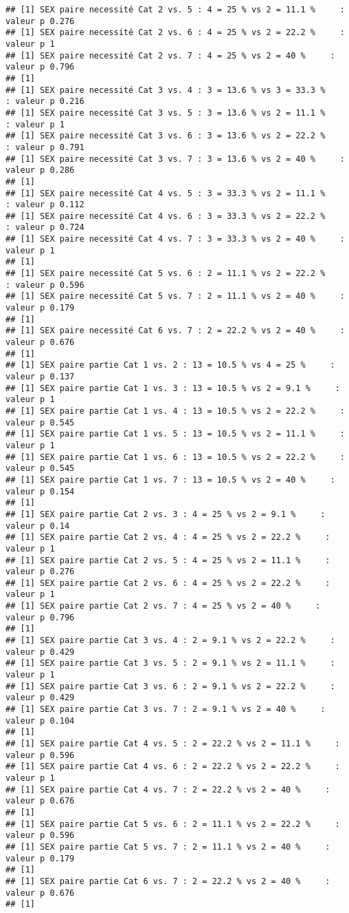 \documentclass[
]{article}
\begin{document}
\begin{verbatim}
## [1] SEX paire necessité Cat 2 vs. 5 : 4 = 25 % vs 2 = 11.1 %     : valeur p 0.276
## [1] SEX paire necessité Cat 2 vs. 6 : 4 = 25 % vs 2 = 22.2 %     : valeur p 1
## [1] SEX paire necessité Cat 2 vs. 7 : 4 = 25 % vs 2 = 40 %     : valeur p 0.796
## [1] 
## [1] SEX paire necessité Cat 3 vs. 4 : 3 = 13.6 % vs 3 = 33.3 %     : valeur p 0.216
## [1] SEX paire necessité Cat 3 vs. 5 : 3 = 13.6 % vs 2 = 11.1 %     : valeur p 1
## [1] SEX paire necessité Cat 3 vs. 6 : 3 = 13.6 % vs 2 = 22.2 %     : valeur p 0.791
## [1] SEX paire necessité Cat 3 vs. 7 : 3 = 13.6 % vs 2 = 40 %     : valeur p 0.286
## [1] 
## [1] SEX paire necessité Cat 4 vs. 5 : 3 = 33.3 % vs 2 = 11.1 %     : valeur p 0.112
## [1] SEX paire necessité Cat 4 vs. 6 : 3 = 33.3 % vs 2 = 22.2 %     : valeur p 0.724
## [1] SEX paire necessité Cat 4 vs. 7 : 3 = 33.3 % vs 2 = 40 %     : valeur p 1
## [1] 
## [1] SEX paire necessité Cat 5 vs. 6 : 2 = 11.1 % vs 2 = 22.2 %     : valeur p 0.596
## [1] SEX paire necessité Cat 5 vs. 7 : 2 = 11.1 % vs 2 = 40 %     : valeur p 0.179
## [1] 
## [1] SEX paire necessité Cat 6 vs. 7 : 2 = 22.2 % vs 2 = 40 %     : valeur p 0.676
## [1] 
## [1] SEX paire partie Cat 1 vs. 2 : 13 = 10.5 % vs 4 = 25 %     : valeur p 0.137
## [1] SEX paire partie Cat 1 vs. 3 : 13 = 10.5 % vs 2 = 9.1 %     : valeur p 1
## [1] SEX paire partie Cat 1 vs. 4 : 13 = 10.5 % vs 2 = 22.2 %     : valeur p 0.545
## [1] SEX paire partie Cat 1 vs. 5 : 13 = 10.5 % vs 2 = 11.1 %     : valeur p 1
## [1] SEX paire partie Cat 1 vs. 6 : 13 = 10.5 % vs 2 = 22.2 %     : valeur p 0.545
## [1] SEX paire partie Cat 1 vs. 7 : 13 = 10.5 % vs 2 = 40 %     : valeur p 0.154
## [1] 
## [1] SEX paire partie Cat 2 vs. 3 : 4 = 25 % vs 2 = 9.1 %     : valeur p 0.14
## [1] SEX paire partie Cat 2 vs. 4 : 4 = 25 % vs 2 = 22.2 %     : valeur p 1
## [1] SEX paire partie Cat 2 vs. 5 : 4 = 25 % vs 2 = 11.1 %     : valeur p 0.276
## [1] SEX paire partie Cat 2 vs. 6 : 4 = 25 % vs 2 = 22.2 %     : valeur p 1
## [1] SEX paire partie Cat 2 vs. 7 : 4 = 25 % vs 2 = 40 %     : valeur p 0.796
## [1] 
## [1] SEX paire partie Cat 3 vs. 4 : 2 = 9.1 % vs 2 = 22.2 %     : valeur p 0.429
## [1] SEX paire partie Cat 3 vs. 5 : 2 = 9.1 % vs 2 = 11.1 %     : valeur p 1
## [1] SEX paire partie Cat 3 vs. 6 : 2 = 9.1 % vs 2 = 22.2 %     : valeur p 0.429
## [1] SEX paire partie Cat 3 vs. 7 : 2 = 9.1 % vs 2 = 40 %     : valeur p 0.104
## [1] 
## [1] SEX paire partie Cat 4 vs. 5 : 2 = 22.2 % vs 2 = 11.1 %     : valeur p 0.596
## [1] SEX paire partie Cat 4 vs. 6 : 2 = 22.2 % vs 2 = 22.2 %     : valeur p 1
## [1] SEX paire partie Cat 4 vs. 7 : 2 = 22.2 % vs 2 = 40 %     : valeur p 0.676
## [1] 
## [1] SEX paire partie Cat 5 vs. 6 : 2 = 11.1 % vs 2 = 22.2 %     : valeur p 0.596
## [1] SEX paire partie Cat 5 vs. 7 : 2 = 11.1 % vs 2 = 40 %     : valeur p 0.179
## [1] 
## [1] SEX paire partie Cat 6 vs. 7 : 2 = 22.2 % vs 2 = 40 %     : valeur p 0.676
## [1]
\end{verbatim}
\end{document}
